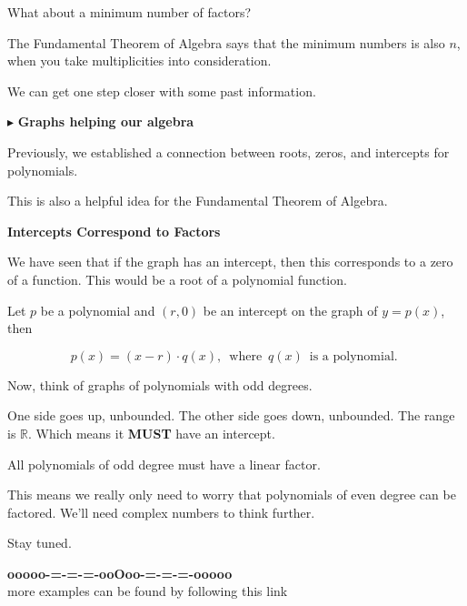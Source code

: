 \documentclass{ximera}
\begin{document}
What about a minimum number of factors? 

The Fundamental Theorem of Algebra says that the minimum numbers is also $n$, when you take multiplicities into consideration. 



We can get one step closer with some past information. 








$\blacktriangleright$ \textbf{\textcolor{blue!55!black}{Graphs helping our algebra}} 


Previously, we established a connection between roots, zeros, and intercepts for polynomials. 


This is also a helpful idea for the Fundamental Theorem of Algebra. 




\begin{idea} \textbf{\textcolor{blue!55!black}{Intercepts Correspond to Factors}}   



We have seen that if the graph has an intercept, then this corresponds to a zero of a function.  This would be a root of a polynomial function. 

Let $p$ be a polynomial and $(r, 0)$ be an intercept on the graph of $y = p(x)$, then 

\[
p(x) = (x-r) \cdot q(x), \, \text{ where } \, q(x) \, \text{ is a polynomial. }
\]

Now, think of graphs of polynomials with odd degrees. 

One side goes up, unbounded.  The other side goes down, unbounded.  The range is $\mathbb{R}$.  Which means it \textbf{MUST} have an intercept.


All polynomials of odd degree must have a linear factor.




\end{idea}


This means we really only need to worry that polynomials of even degree can be factored.  We'll need complex numbers to think further. 


Stay tuned.

























\begin{center}
\textbf{\textcolor{green!50!black}{ooooo-=-=-=-ooOoo-=-=-=-ooooo}} \\

more examples can be found by following this link\\ 

\end{center}
\end{document}
